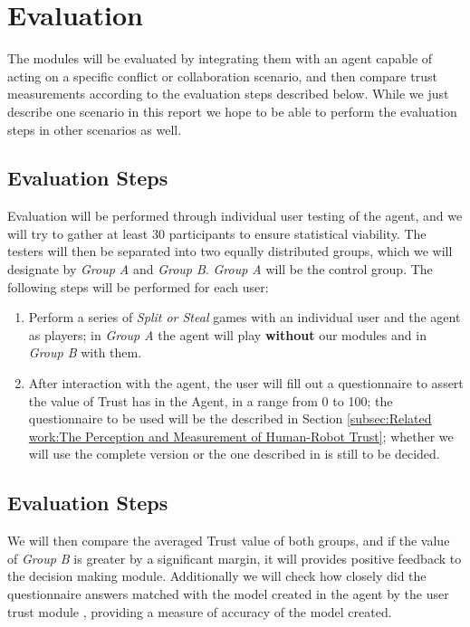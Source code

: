 \section{Evaluation}
\label{sec:Evaluation}

The modules will be evaluated by integrating them with an agent capable of acting on a specific conflict or collaboration scenario, and then compare trust measurements according to the evaluation steps described below. While we just describe one scenario in this report we hope to be able to perform the evaluation steps in other scenarios as well.

\subsection{Evaluation Steps}
\label{subsec:Evaluation:Evaluation Steps}
Evaluation will be performed through individual user testing of the agent, and we will try to gather at least 30 participants to ensure statistical viability. The testers will then be separated into two equally distributed groups, which we will designate by \textit{Group A} and \textit{Group B}. \textit{Group A} will be the control group.  The following steps will be performed for each user:

\begin{enumerate}
	\item Perform a series of \textit{Split or Steal} games with an individual user and the agent as players; in \textit{Group A} the agent will play \textbf{without} our modules and in \textit{Group B} with them.
	\item After interaction with the agent, the user will fill out a questionnaire to assert the value of Trust has in the Agent, in a range from 0 to 100; the questionnaire to be used will be the described in Section \ref{subsec:Related work:The Perception and Measurement of Human-Robot Trust}; whether we will use the complete version or the one described in %
	is still to be decided.
\end{enumerate}

\subsection{Evaluation Steps}
We will then compare the averaged Trust value of both groups, and if the value of \textit{Group B} is greater by a significant margin, it will provides positive feedback to the decision making module. Additionally we will check how closely did the questionnaire answers matched with the model created in the agent by the user trust module %
, providing a measure of accuracy of the model created.

